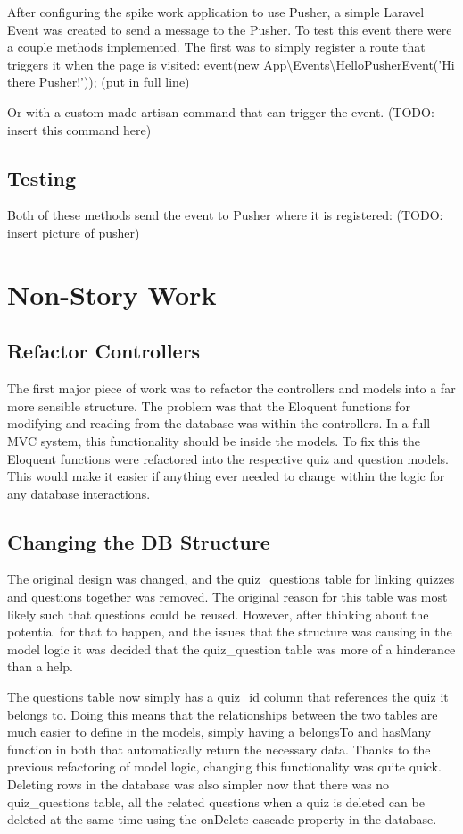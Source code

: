 \documentclass{article}
\begin{document}
After configuring the spike work application to use Pusher, a simple Laravel Event was created to send a message to the Pusher. To test this event there were a couple methods implemented. The first was to simply register a route that triggers it when the page is visited: 
	event(new App\textbackslash Events\textbackslash HelloPusherEvent('Hi there Pusher!')); (put in full line)
 
Or with a custom made artisan command that can trigger the event. (TODO: insert this command here)
 
\subsection{Testing}
Both of these methods send the event to Pusher where it is registered: (TODO: insert picture of pusher)
\newpage

\section{Non-Story Work}
\subsection{Refactor Controllers}
The first major piece of work was to refactor the controllers and models into a far more sensible structure. The problem was that the Eloquent functions for modifying and reading from the database was within the controllers. In a full MVC system, this functionality should be inside the models. To fix this the Eloquent functions were refactored into the respective quiz and question models. This would make it easier if anything ever needed to change within the logic for any database interactions.
\subsection{Changing the DB Structure}
The original design was changed, and the quiz\_questions table for linking quizzes and questions together was removed. The original reason for this table was most likely such that questions could be reused. However, after thinking about the potential for that to happen, and the issues that the structure was causing in the model logic it was decided that the quiz\_question table was more of a hinderance than a help.

The questions table now simply has a quiz\_id column that references the quiz it belongs to. Doing this means that the relationships between the two tables are much easier to define in the models, simply having a belongsTo and hasMany function in both that automatically return the necessary data. Thanks to the previous refactoring of model logic, changing this functionality was quite quick. Deleting rows in the database was also simpler now that there was no quiz\_questions table, all the related questions when a quiz is deleted can be deleted at the same time using the onDelete cascade property in the database.
\end{document}
